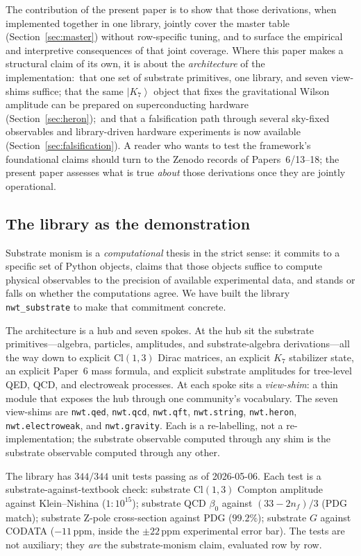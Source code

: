 \documentclass[11pt]{article}
\newcommand{\ket}[1]{\left|#1\right\rangle}
\newcommand{\nwtsub}{\texttt{nwt\_substrate}}
\begin{document}
The contribution of the present paper is to show that those
derivations, when implemented together in one library, jointly
cover the master table (Section~\ref{sec:master}) without
row-specific tuning, and to surface the empirical and
interpretive consequences of that joint coverage.  Where this
paper makes a structural claim of its own, it is about the
\emph{architecture} of the implementation:\ that one set of
substrate primitives, one library, and seven view-shims suffice;
that the same $\ket{K_7}$ object that fixes the gravitational
Wilson amplitude can be prepared on superconducting hardware
(Section~\ref{sec:heron});\ and that a falsification path
through several sky-fixed observables and library-driven
hardware experiments is now available
(Section~\ref{sec:falsification}).  A reader who wants to test
the framework's foundational claims should turn to the Zenodo
records of Papers~6/13--18; the present paper assesses what is
true \emph{about} those derivations once they are jointly
operational.

\subsection{The library as the demonstration}

Substrate monism is a \emph{computational} thesis in the strict
sense: it commits to a specific set of Python objects, claims that
those objects suffice to compute physical observables to the
precision of available experimental data, and stands or falls on
whether the computations agree.  We have built the library
\nwtsub{} to make that commitment concrete.

The architecture is a hub and seven spokes.  At the hub sit the
substrate primitives---algebra, particles, amplitudes, and
substrate-algebra derivations---all the way down to explicit
$\mathrm{Cl}(1,3)$ Dirac matrices, an explicit $K_7$ stabilizer
state, an explicit Paper~6 mass formula, and explicit substrate
amplitudes for tree-level QED, QCD, and electroweak processes.  At
each spoke sits a \emph{view-shim}: a thin module that exposes the
hub through one community's vocabulary.  The seven view-shims are
\texttt{nwt.qed}, \texttt{nwt.qcd}, \texttt{nwt.qft},
\texttt{nwt.string}, \texttt{nwt.heron}, \texttt{nwt.electroweak},
and \texttt{nwt.gravity}.  Each is a re-labelling, not a
re-implementation; the substrate observable computed through any
shim is the substrate observable computed through any other.

The library has $344/344$ unit tests passing as of 2026-05-06.
Each test is a substrate-against-textbook check: substrate
$\mathrm{Cl}(1,3)$ Compton amplitude against Klein--Nishina
($1\!:\!10^{15}$); substrate QCD $\beta_0$ against $(33-2n_f)/3$
(PDG match); substrate Z-pole cross-section against PDG
($99.2\%$); substrate $G$ against CODATA ($-11$\,ppm, inside the
$\pm 22$\,ppm experimental error bar).  The tests are not
auxiliary; they \emph{are} the substrate-monism claim, evaluated
row by row.
\end{document}
